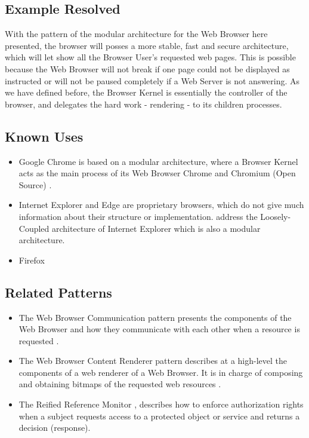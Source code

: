 \documentclass[prodmode,hillsideplop]{acmlarge}
\begin{document}
\subsection{Example Resolved}
With the pattern of the modular architecture for the Web Browser here presented, the browser will posses a more stable, fast and secure architecture, which will let show all the Browser User's requested web pages. This is possible because the Web Browser will not break if one page could not be displayed as instructed or will not be paused completely if a Web Server is not answering. As we have defined before, the Browser Kernel is essentially the controller of the browser, and delegates the hard work - rendering - to its children processes.


\subsection{Known Uses}
\begin{itemize}
	\item Google Chrome is based on a modular architecture, where a Browser Kernel acts as the main process of its Web Browser Chrome and Chromium (Open Source) \cite{barth2008security}. 
    \item Internet Explorer and Edge are proprietary browsers, which do not give much information about their structure or implementation. \cite{Crowley2010,IE8LCIE2} address the Loosely-Coupled architecture of Internet Explorer which is also a modular architecture.
	\item Firefox \cite{firefoxMulti}

\end{itemize}

\subsection{Related Patterns}
\begin{itemize}
	\item The Web Browser Communication pattern presents the components of the Web Browser and how they communicate with each other when a resource is requested \cite{silva2015}.
    \item The Web Browser Content Renderer pattern describes at a high-level the components of a web renderer of a Web Browser. It is in charge of composing and obtaining bitmaps of the requested web resources \cite{silva2016a}.
    \item The Reified Reference Monitor \cite{fernandez2013security}, describes how to enforce authorization rights when a subject requests access to a protected object or service and returns a decision (response).
\end{itemize}
\end{document}
